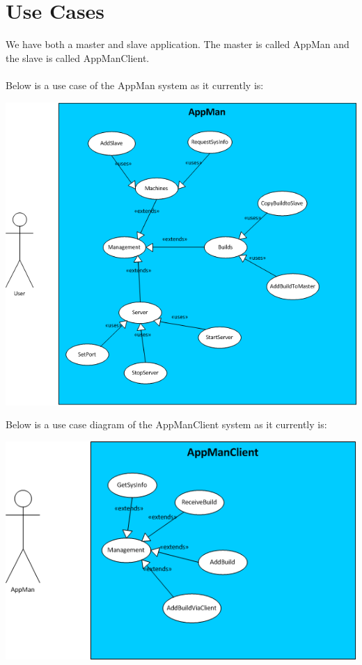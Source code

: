 \documentclass[a4paper,12pt,final]{article}
\begin{document}
\section{Use Cases}
We have both a master and slave application. The master is called AppMan and the slave is called AppManClient.\\
\textbf{\\}
Below is a use case of the AppMan system as it currently is:\\
\begin{center}
\includegraphics[scale=0.8]{UseCaseAppMan.png}
\end{center}
Below is a use case diagram of the AppManClient system as it currently is:\\
\begin{center}
\includegraphics[scale=0.7]{UseCaseAppManClient.png}
\end{center}
\end{document}
